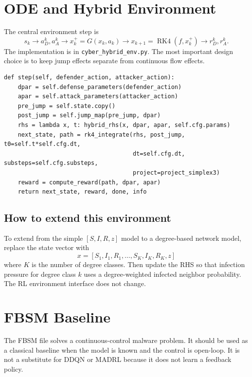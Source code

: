 \documentclass[11pt,a4paper]{article}
\begin{document}
\section{ODE and Hybrid Environment}
The central environment step is
\begin{equation}
\boxed{s_k}\rightarrow\boxed{a_D^k,a_A^k}\rightarrow\boxed{x_k^+=G(x_k,a_k)}\rightarrow\boxed{x_{k+1}=\operatorname{RK4}(f,x_k^+)}\rightarrow\boxed{r_D^k,r_A^k}.
\end{equation}
The implementation is in \texttt{cyber\_hybrid\_env.py}. The most important design choice is to keep jump effects separate from continuous flow effects.

\begin{lstlisting}[style=pythonstyle,caption={Core idea of a sampled-data hybrid environment step.}]
def step(self, defender_action, attacker_action):
    dpar = self.defense_parameters(defender_action)
    apar = self.attack_parameters(attacker_action)
    pre_jump = self.state.copy()
    post_jump = self.jump_map(pre_jump, dpar)
    rhs = lambda x, t: hybrid_rhs(x, dpar, apar, self.cfg.params)
    next_state, path = rk4_integrate(rhs, post_jump, t0=self.t*self.cfg.dt,
                                     dt=self.cfg.dt, substeps=self.cfg.substeps,
                                     project=project_simplex3)
    reward = compute_reward(path, dpar, apar)
    return next_state, reward, done, info
\end{lstlisting}

\subsection{How to extend this environment}
To extend from the simple $[S,I,R,z]$ model to a degree-based network model, replace the state vector with
\begin{equation}
x=[S_1,I_1,R_1,\ldots,S_K,I_K,R_K,z]
\end{equation}
where $K$ is the number of degree classes. Then update the RHS so that infection pressure for degree class $k$ uses a degree-weighted infected neighbor probability. The RL environment interface does not change.

\section{FBSM Baseline}
The FBSM file solves a continuous-control malware problem. It should be used as a classical baseline when the model is known and the control is open-loop. It is not a substitute for DDQN or MADRL because it does not learn a feedback policy.
\end{document}
